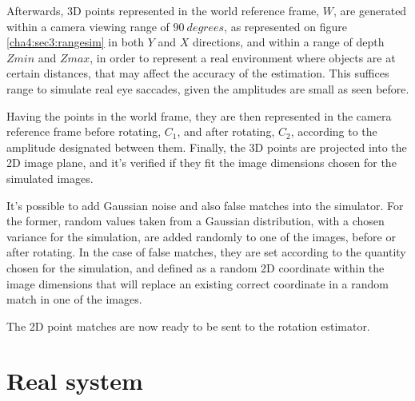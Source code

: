 Afterwards, 3D points represented in the world reference frame, ${W}$, are generated within a camera viewing range of $90 \ degrees$, as represented on figure \ref{cha4:sec3:rangesim} in both $Y$ and $X$ directions, and within a range of depth $Zmin$ and $Zmax$, in order to represent a real environment where objects are at certain distances, that may affect the accuracy of the estimation. This suffices range to simulate real eye saccades, given the amplitudes are small as seen before. 

Having the points in the world frame, they are then represented in the camera reference frame before rotating, ${C_1}$, and after rotating, ${C_2}$, according to the amplitude designated between them. Finally, the 3D points are projected into the 2D image plane, and it's verified if they fit the image dimensions chosen for the simulated images.

It's possible to add Gaussian noise and also false matches into the simulator. For the former, random values taken from a Gaussian distribution, with a chosen variance for the simulation, are added randomly to one of the images, before or after rotating. In the case of false matches, they are set according to the quantity chosen for the simulation, and defined as a random 2D coordinate within the image dimensions that will replace an existing correct coordinate in a random match in one of the images.

The 2D point matches are now ready to be sent to the rotation estimator.

\section{Real system}

